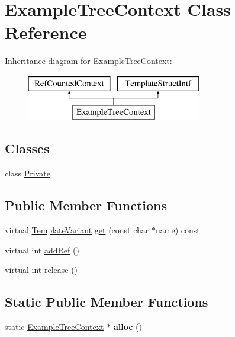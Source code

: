 \hypertarget{class_example_tree_context}{}\section{Example\+Tree\+Context Class Reference}
\label{class_example_tree_context}
Inheritance diagram for Example\+Tree\+Context\+:\begin{figure}[H]
\begin{center}
\leavevmode
\includegraphics[height=2.000000cm]{class_example_tree_context}
\end{center}
\end{figure}
\subsection*{Classes}
\begin{DoxyCompactItemize}
\item 
class \mbox{\hyperlink{class_example_tree_context_1_1_private}{Private}}
\end{DoxyCompactItemize}
\subsection*{Public Member Functions}
\begin{DoxyCompactItemize}
\item 
virtual \mbox{\hyperlink{class_template_variant}{Template\+Variant}} \mbox{\hyperlink{class_example_tree_context_a5ac1d50a13e3ee839f34864d828aafcb}{get}} (const char $\ast$name) const
\item 
virtual int \mbox{\hyperlink{class_example_tree_context_a217c6d4ffff27298d9ca020f81e4a958}{add\+Ref}} ()
\item 
virtual int \mbox{\hyperlink{class_example_tree_context_af1d94cfff79db89a390eb189ebe9d15b}{release}} ()
\end{DoxyCompactItemize}
\subsection*{Static Public Member Functions}
\begin{DoxyCompactItemize}
\item 
\mbox{\label{class_example_tree_context_af561575f80c36ae0be6296537021bc78}} 
static \mbox{\hyperlink{class_example_tree_context}{Example\+Tree\+Context}} $\ast$ {\bfseries alloc} ()
\end{DoxyCompactItemize}


